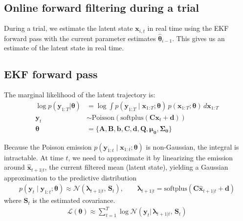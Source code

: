 \documentclass[11pt,letterpaper]{article} %
\begin{document}
\clearpage
\subsection*{Online forward filtering during a trial}
During a trial, we estimate the latent state $\bm{x}_{i,t}$ in real time using the EKF forward pass with the current parameter estimates $\hat{\boldsymbol{\theta}}_{i-1}$. This gives us an estimate of the latent state in real time.
\subsection*{EKF forward pass} %
The marginal likelihood of the latent trajectory is:
\begin{align*}
    \log p(\bm{y}_{1:T}|\boldsymbol{\theta})
        &= \log \int p(\bm{y}_{1:T} \mid \bm{x}_{1:T};\boldsymbol{\theta})\,
                       p(\bm{x}_{1:T};\boldsymbol{\theta})\, d\bm{x}_{1:T}\\
\bm{y}_t &\sim \text{Poisson}\!\left(\text{softplus}\!\left(\bm{C}\bm{x}_t + \bm{d}\right)\right)\\
\boldsymbol{\theta} &= \{\bm{A, B, b, C, d, Q, \mu_0, \Sigma_0}\}
\end{align*}

Because the Poisson emission $p(\bm{y}_{1:t} \mid \bm{x}_{1:t};\boldsymbol{\theta})$
is non-Gaussian, the integral is intractable. At time $t$, we need to approximate it by linearizing the emission around $\hat{\bm{x}}_{t+1|t}$, the current filtered mean (latent state), yielding a Gaussian approximation to the predictive distribution
\begin{align*}
    p(\bm{y}_t \mid \bm{y}_{1:t};\boldsymbol{\theta})
        \approx \mathcal{N}(\boldsymbol{\lambda}_{t+1|t},\, \bm{S}_t), \qquad
    \boldsymbol{\lambda}_{t+1|t} = \text{softplus}\!\left(\bm{C}\hat{\bm{x}}_{t+1|t} + \bm{d}\right)
\end{align*}
where $\bm{S}_t$ is the estimated covariance.
\begin{align*}
    \mathcal{L}(\boldsymbol{\theta})
        \approx \sum_{t=1}^{T} \log \mathcal{N}(\bm{y}_t|\,
                \boldsymbol{\lambda}_{t+1|t},\, \bm{S}_t)
\end{align*}
\end{document}
